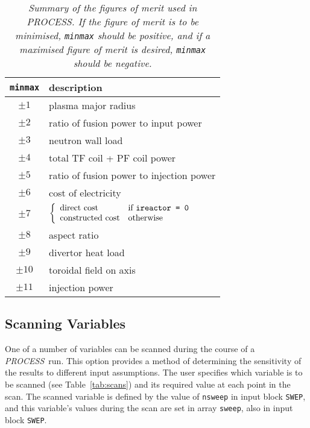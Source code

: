 \documentclass[11pt,a4paper]{report}
\makeatletter
\newcommand{\PS}{\mbox{\it PROCESS\/ }}
\newcommand{\PSD}{\mbox{\it PROCESS}\@.\/ }
\makeatother
\begin{document}

\begin{table}[tbph]
\begin{center}

\begin{tabular}{||c|l||} \hline
{\tt minmax} & description                            \\ \hline
$\pm 1 $     & plasma major radius \\
$\pm 2 $     & ratio of fusion power to input power \\
$\pm 3 $     & neutron wall load \\
$\pm 4 $     & total TF coil + PF coil power \\
$\pm 5 $     & ratio of fusion power to injection power \\
$\pm 6 $     & cost of electricity \\
$\pm 7 $     & 
$ \left\{ \begin{array}{ll}
 \mbox{direct cost} & \mbox{if {\tt ireactor = 0}} \\
 \mbox{constructed cost} & \mbox{otherwise}
\end{array} \right.
$ \\
$\pm 8 $     & aspect ratio \\
$\pm 9 $     & divertor heat load \\
$\pm 10$     & toroidal field on axis \\
$\pm 11$     & injection power \\ \hline
\end{tabular}
\end{center}
\caption[TABLE_FOMS]{{\it
Summary of the figures of merit used in \PSD If the figure of merit is
to be minimised, {\tt minmax} should be positive, and if a maximised
figure of merit is desired, {\tt minmax} should be negative.
}}
\label{tab:foms}
\end{table}


\subsection{Scanning Variables}
\label{sec:scans}

One of a number of variables can be scanned during the course of a \PS run.
This option provides a method of determining the sensitivity of the results to
different input assumptions. The user specifies which variable is to be
scanned (see Table~\ref{tab:scans}) and its required value at each point in
the scan. The scanned variable is defined by the value of {\tt nsweep} in
input block {\tt SWEP}, and this variable's values during the scan are set in
array {\tt sweep}, also in input block {\tt SWEP}.
\end{document}
